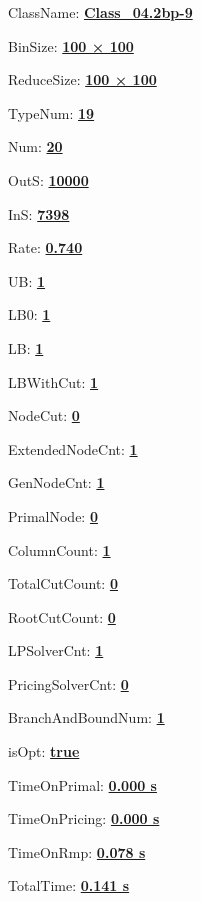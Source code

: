\documentclass[11pt]{article}
\begin{document}
\pagestyle{empty}


ClassName: \underline{\textbf{Class_04.2bp-9}}
\par
BinSize: \underline{\textbf{100 × 100}}
\par
ReduceSize: \underline{\textbf{100 × 100}}
\par
TypeNum: \underline{\textbf{19}}
\par
Num: \underline{\textbf{20}}
\par
OutS: \underline{\textbf{10000}}
\par
InS: \underline{\textbf{7398}}
\par
Rate: \underline{\textbf{0.740}}
\par
UB: \underline{\textbf{1}}
\par
LB0: \underline{\textbf{1}}
\par
LB: \underline{\textbf{1}}
\par
LBWithCut: \underline{\textbf{1}}
\par
NodeCut: \underline{\textbf{0}}
\par
ExtendedNodeCnt: \underline{\textbf{1}}
\par
GenNodeCnt: \underline{\textbf{1}}
\par
PrimalNode: \underline{\textbf{0}}
\par
ColumnCount: \underline{\textbf{1}}
\par
TotalCutCount: \underline{\textbf{0}}
\par
RootCutCount: \underline{\textbf{0}}
\par
LPSolverCnt: \underline{\textbf{1}}
\par
PricingSolverCnt: \underline{\textbf{0}}
\par
BranchAndBoundNum: \underline{\textbf{1}}
\par
isOpt: \underline{\textbf{true}}
\par
TimeOnPrimal: \underline{\textbf{0.000 s}}
\par
TimeOnPricing: \underline{\textbf{0.000 s}}
\par
TimeOnRmp: \underline{\textbf{0.078 s}}
\par
TotalTime: \underline{\textbf{0.141 s}}
\par
\newpage
\end{document}
